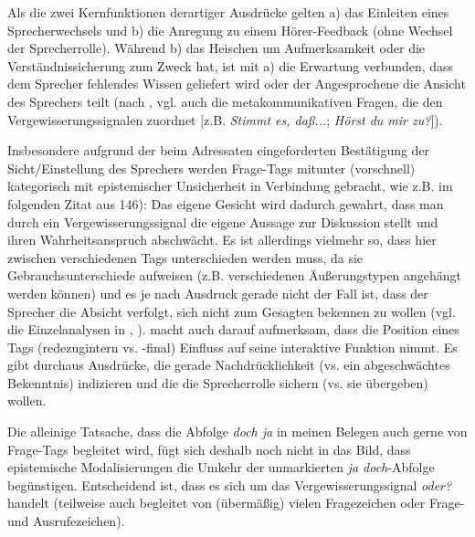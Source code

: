 Als die zwei Kernfunktionen derartiger Ausdrücke gelten a) das Einleiten eines Sprecherwechsels und b) die Anregung zu einem Hörer-Feedback (ohne Wechsel der Sprecherrolle). Während b) das Heischen um Aufmerksamkeit oder die Verständnissicherung zum Zweck hat, ist mit a) die Erwartung verbunden, dass dem Sprecher fehlendes Wissen geliefert wird oder der Angesprochene die Ansicht des Sprechers teilt (nach \citealt[146]{Hagemann2009}, vgl. auch die metakommunikativen Fragen, die \citealt[73]{Willkop1988} den Vergewisserungssignalen zuordnet $[$z.B. \textit{Stimmt es, daß...}; \textit{Hörst du mir zu?}$]$). 

Insbesondere aufgrund der beim Adressaten eingeforderten Bestätigung der Sicht/Einstellung des Sprechers werden Frage-Tags  mitunter (vorschnell) kategorisch mit epistemischer Unsicherheit in Verbindung gebracht, wie z.B. im folgenden Zitat aus \citet[146]{Imo2011} 146): \glqq Das eigene Gesicht wird dadurch gewahrt, dass man durch ein Vergewisserungssignal die eigene Aussage zur Diskussion stellt und ihren Wahrheitsanspruch abschwächt.\grqq{} Es ist allerdings vielmehr so, dass hier zwischen verschiedenen Tags unterschieden werden muss, da sie Gebrauchsunterschiede aufweisen (z.B. verschiedenen Äußerungstypen angehängt werden können) und es je nach Ausdruck gerade nicht der Fall ist, dass der Sprecher die Absicht verfolgt, sich nicht zum Gesagten bekennen zu wollen (vgl. die Einzelanalysen in \citealt[125-134]{Bublitz1978}, \citealt[253-261, 262-270, 271-275]{Willkop1988}). \citet{Hagemann2009} macht auch darauf aufmerksam, dass die Position eines Tags (redezugintern vs. -final) Einfluss auf seine interaktive Funktion nimmt. Es gibt durchaus Ausdrücke, die gerade Nachdrücklichkeit (vs. ein abgeschwächtes Be\-kenntnis) indizieren und die die Sprecherrolle sichern (vs. sie übergeben) wollen. 

Die alleinige Tatsache, dass die Abfolge \textit{doch ja} in meinen Belegen auch gerne von Frage-Tags begleitet wird, fügt sich deshalb noch nicht in das Bild, dass epistemische Modalisierungen  die Umkehr der unmarkierten \textit{ja doch}-Abfolge begünstigen. Entscheidend ist, dass es sich um das Vergewisserungssignal \textit{oder?} handelt (teilweise auch begleitet von (übermäßig) vielen Fragezeichen oder Frage- und Ausrufezeichen).

